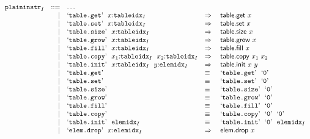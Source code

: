 $$
\begin{array}[t]{@{}lrrl@{}l@{}l@{}l@{}}
& {{\mathtt{plaininstr}}}_{I} & ::= & \dots \\
& & | & \mbox{‘\texttt{table.get}’}~~x{:}{{\mathtt{tableidx}}}_{I} & \quad\Rightarrow\quad{} & \mathsf{table{.}get}~x \\
& & | & \mbox{‘\texttt{table.set}’}~~x{:}{{\mathtt{tableidx}}}_{I} & \quad\Rightarrow\quad{} & \mathsf{table{.}set}~x \\
& & | & \mbox{‘\texttt{table.size}’}~~x{:}{{\mathtt{tableidx}}}_{I} & \quad\Rightarrow\quad{} & \mathsf{table{.}size}~x \\
& & | & \mbox{‘\texttt{table.grow}’}~~x{:}{{\mathtt{tableidx}}}_{I} & \quad\Rightarrow\quad{} & \mathsf{table{.}grow}~x \\
& & | & \mbox{‘\texttt{table.fill}’}~~x{:}{{\mathtt{tableidx}}}_{I} & \quad\Rightarrow\quad{} & \mathsf{table{.}fill}~x \\
& & | & \mbox{‘\texttt{table.copy}’}~~x_1{:}{{\mathtt{tableidx}}}_{I}~~x_2{:}{{\mathtt{tableidx}}}_{I} & \quad\Rightarrow\quad{} & \mathsf{table{.}copy}~x_1~x_2 \\
& & | & \mbox{‘\texttt{table.init}’}~~x{:}{{\mathtt{tableidx}}}_{I}~~y{:}{{\mathtt{elemidx}}}_{I} & \quad\Rightarrow\quad{} & \mathsf{table{.}init}~x~y \\
& & | & \mbox{‘\texttt{table.get}’} & \quad\equiv\quad{} & \mbox{‘\texttt{table.get}’}~~\mbox{‘\texttt{0}’} \\
& & | & \mbox{‘\texttt{table.set}’} & \quad\equiv\quad{} & \mbox{‘\texttt{table.set}’}~~\mbox{‘\texttt{0}’} \\
& & | & \mbox{‘\texttt{table.size}’} & \quad\equiv\quad{} & \mbox{‘\texttt{table.size}’}~~\mbox{‘\texttt{0}’} \\
& & | & \mbox{‘\texttt{table.grow}’} & \quad\equiv\quad{} & \mbox{‘\texttt{table.grow}’}~~\mbox{‘\texttt{0}’} \\
& & | & \mbox{‘\texttt{table.fill}’} & \quad\equiv\quad{} & \mbox{‘\texttt{table.fill}’}~~\mbox{‘\texttt{0}’} \\
& & | & \mbox{‘\texttt{table.copy}’} & \quad\equiv\quad{} & \mbox{‘\texttt{table.copy}’}~~\mbox{‘\texttt{0}’}~~\mbox{‘\texttt{0}’} \\
& & | & \mbox{‘\texttt{table.init}’}~~{{\mathtt{elemidx}}}_{I} & \quad\equiv\quad{} & \mbox{‘\texttt{table.init}’}~~\mbox{‘\texttt{0}’}~~{{\mathtt{elemidx}}}_{I} \\
& & | & \mbox{‘\texttt{elem.drop}’}~~x{:}{{\mathtt{elemidx}}}_{I} & \quad\Rightarrow\quad{} & \mathsf{elem{.}drop}~x \\
\end{array}
$$

